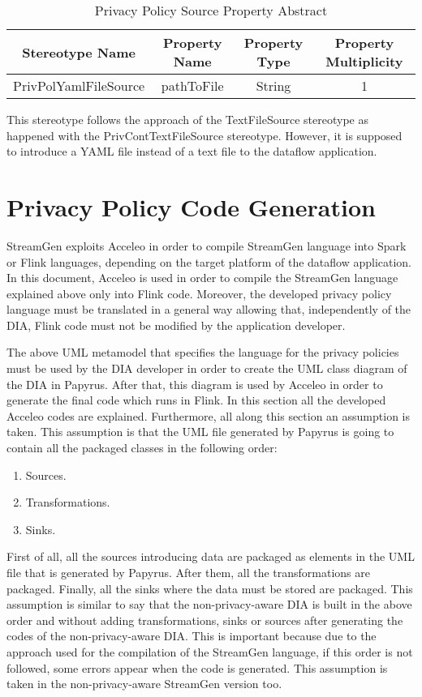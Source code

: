 \begin{table}[h!]
\centering
	\begin{tabular}{||c|c|c|c||} 
	\hline\hline
	Stereotype Name & Property Name & Property Type & Property Multiplicity \\ [1ex] 
	\hline\hline
	PrivPolYamlFileSource & pathToFile & String & 1 \\
	\hline\hline
	\end{tabular}
\caption{Privacy Policy Source Property Abstract}
\label{Privacy Policy Source Property Abstract}
\end{table}

This stereotype follows the approach of the TextFileSource stereotype as happened with the PrivContTextFileSource stereotype. However, it is supposed to introduce a YAML file instead of a text file to the dataflow application.

\section{Privacy Policy Code Generation}

StreamGen exploits Acceleo in order to compile StreamGen language into Spark or Flink languages, depending on the target platform of the dataflow application. In this document, Acceleo is used in order to compile the StreamGen language explained above only into Flink code. Moreover, the developed privacy policy language must be translated in a general way allowing that, independently of the DIA, Flink code must not be modified by the application developer.

The above UML metamodel that specifies the language for the privacy policies must be used by the DIA developer in order to create the UML class diagram of the DIA in Papyrus. After that, this diagram is used by Acceleo in order to generate the final code which runs in Flink. In this section all the developed Acceleo codes are explained. Furthermore, all along this section an assumption is taken. This assumption is that the UML file generated by Papyrus is going to contain all the packaged classes in the following order:

\begin{enumerate}
\item Sources.
\item Transformations.
\item Sinks.
\end{enumerate}

First of all, all the sources introducing data are packaged as elements in the UML file that is generated by Papyrus. After them, all the transformations are packaged. Finally, all the sinks where the data must be stored are packaged. This assumption is similar to say that the non-privacy-aware DIA is built in the above order and without adding transformations, sinks or sources after generating the codes of the non-privacy-aware DIA. This is important because due to the approach used for the compilation of the StreamGen language, if this order is not followed, some errors appear when the code is generated. This assumption is taken in the non-privacy-aware StreamGen version too.

